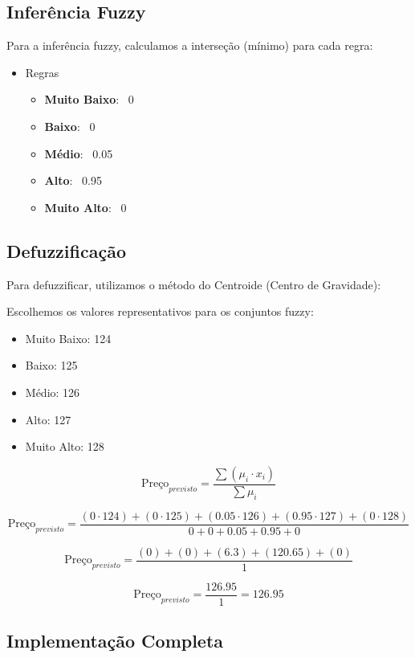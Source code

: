 \documentclass[a4paper, 12pt]{article}
\begin{document}
\subsection{Inferência Fuzzy}

Para a inferência fuzzy, calculamos a interseção (mínimo) para cada regra:

\begin{itemize}
    \item Regras
    \begin{itemize}
        \item \textbf{Muito Baixo}: \>\ 0
        \item \textbf{Baixo}: \>\ 0
        \item \textbf{Médio}: \>\ 0.05
        \item \textbf{Alto}: \>\ 0.95
        \item \textbf{Muito Alto}: \>\ 0
    \end{itemize}
\end{itemize}

\subsection{Defuzzificação}

Para defuzzificar, utilizamos o método do Centroide (Centro de Gravidade):

Escolhemos os valores representativos para os conjuntos fuzzy:\\

\begin{itemize}
    \item Muito Baixo: 124
    \item Baixo: 125
    \item Médio: 126
    \item Alto: 127
    \item Muito Alto: 128
\end{itemize}


\[
\text{Preço}_{previsto} = \frac{\sum (\mu_i \cdot x_i)}{\sum \mu_i}
\]

\[
\text{Preço}_{previsto} = \frac{(0 \cdot 124) + (0 \cdot 125) + (0.05 \cdot 126) + (0.95 \cdot 127) + (0 \cdot 128)}{0 + 0 + 0.05 + 0.95 + 0}
\]

\[
\text{Preço}_{previsto} = \frac{(0) + (0) + (6.3) + (120.65) + (0)}{1}
\]

\[
\text{Preço}_{previsto} = \frac{126.95}{1} = 126.95
\]

\subsection{Implementação Completa}
\end{document}
